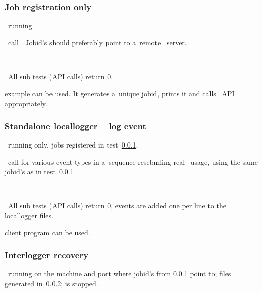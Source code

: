 \subsubsection{Job registration only}
\label{reg}
\req\ running 

\what\ call . Jobid's should preferably point
to a~remote \LB\ server.

\how\ 

\result\ All sub tests (API calls) return 0.

\begin{hints}
 example can be used. It generates a~unique jobid,
prints it and calls \LB\ API appropriately.
\end{hints}



\subsubsection{Standalone locallogger -- log event}
\label{log}

\req\ running  only, jobs registered in test~\ref{reg}.

\what\ call  for various event types in a~sequence
resebmling real \LB\ usage, using the same jobid's as in test~\ref{reg}

\how\ 

\result\ All sub tests (API calls) return 0, events are added one per line to the locallogger files.

\begin{hints}
 client program can be used.

\end{hints}



\subsubsection{Interlogger recovery}
\label{recover}

\req\ running  on the machine and port where
jobid's from \ref{reg} point to; files generated in~\ref{log};
 is stopped.

